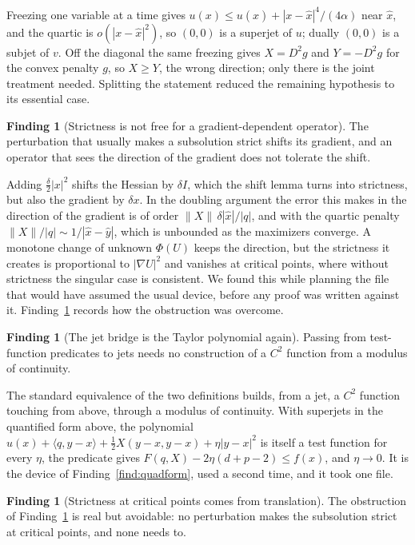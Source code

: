 \documentclass[11pt,reqno]{amsart}
\theoremstyle{plain}
\theoremstyle{definition}
\newtheorem{finding}[theorem]{Finding}
\begin{document}
Freezing one variable at a time gives
$u(x) \le u(\hat x) + |x - \hat x|^4/(4\alpha)$ near $\hat x$, and the quartic is
$o(|x - \hat x|^2)$, so $(0, 0)$ is a superjet of $u$; dually $(0, 0)$ is a subjet
of $v$. Off the diagonal the same freezing gives $X = D^2 g$ and $Y = -D^2 g$
for the convex penalty $g$, so $X \ge Y$, the wrong direction; only there is the
joint treatment needed. Splitting the statement reduced the remaining hypothesis
to its essential case.

\begin{finding}[Strictness is not free for a gradient-dependent
operator]\label{find:strictdev}
The perturbation that usually makes a subsolution strict shifts its gradient,
and an operator that sees the direction of the gradient does not tolerate the
shift.
\end{finding}

Adding $\tfrac\delta2|x|^2$ shifts the Hessian by $\delta I$, which the shift
lemma turns into strictness, but also the gradient by $\delta x$. In the
doubling argument the error this makes in the direction of the gradient is of
order $\|X\|\,\delta|\hat x|/|q|$, and with the quartic penalty
$\|X\|/|q| \sim 1/|\hat x - \hat y|$, which is unbounded as the maximizers
converge. A monotone change of unknown $\Phi(U)$ keeps the direction, but the
strictness it creates is proportional to $|\nabla U|^2$ and vanishes at critical
points, where without strictness the singular case is consistent. We found
this while planning the file that would have assumed the usual device, before
any proof was written against it. Finding~\ref{find:translate} records how the
obstruction was overcome.

\begin{finding}[The jet bridge is the Taylor polynomial
again]\label{find:jetbridge}
Passing from test-function predicates to jets needs no construction of a $C^2$
function from a modulus of continuity.
\end{finding}

The standard equivalence of the two definitions builds, from a jet, a $C^2$
function touching from above, through a modulus of continuity. With superjets
in the quantified form above, the polynomial
$u(x) + \langle q, y - x\rangle + \tfrac12 X(y - x, y - x) + \eta|y - x|^2$ is
itself a test function for every $\eta$, the predicate gives
$F(q, X) - 2\eta(d + p - 2) \le f(x)$, and $\eta \to 0$. It is the device of
Finding~\ref{find:quadform}, used a second time, and it took one file.

\begin{finding}[Strictness at critical points comes from
translation]\label{find:translate}
The obstruction of Finding~\ref{find:strictdev} is real but avoidable: no
perturbation makes the subsolution strict at critical points, and none needs
to.
\end{finding}
\end{document}
